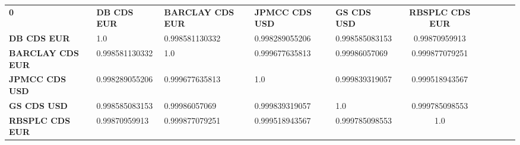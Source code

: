 \begin{tabular}{|l|l|l|l|l|c|c|c|c|c|}
\hline
\textbf{0} & \textbf{DB CDS EUR} & \textbf{BARCLAY CDS EUR} & \textbf{JPMCC CDS USD} & \textbf{GS CDS USD} & \textbf{RBSPLC CDS EUR}\\\hhline{|=|=|=|=|=|=|}
\textbf{DB CDS EUR} & 1.0 & 0.998581130332 & 0.998289055206 & 0.998585083153 & 0.99870959913\\
\textbf{BARCLAY CDS EUR} & 0.998581130332 & 1.0 & 0.999677635813 & 0.99986057069 & 0.999877079251\\
\textbf{JPMCC CDS USD} & 0.998289055206 & 0.999677635813 & 1.0 & 0.999839319057 & 0.999518943567\\
\textbf{GS CDS USD} & 0.998585083153 & 0.99986057069 & 0.999839319057 & 1.0 & 0.999785098553\\
\textbf{RBSPLC CDS EUR} & 0.99870959913 & 0.999877079251 & 0.999518943567 & 0.999785098553 & 1.0\\
\hline
\end{tabular}
